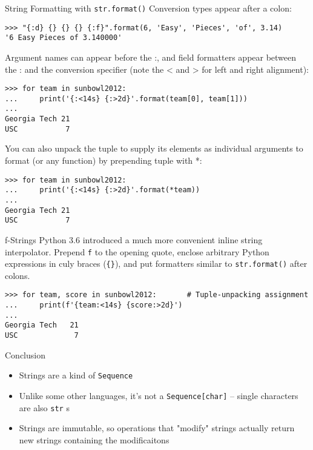 \documentclass[smaller, aspectratio=1610]{beamer}
\begin{document}
\begin{frame}[label={sec:org62fce8c},fragile]{String Formatting with \texttt{str.format()}}
 Conversion types appear after a colon:

\lstset{language=Python,label= ,caption= ,captionpos=b,numbers=none}
\begin{lstlisting}
>>> "{:d} {} {} {} {:f}".format(6, 'Easy', 'Pieces', 'of', 3.14)
'6 Easy Pieces of 3.140000'
\end{lstlisting}

Argument names can appear before the :, and field formatters appear
between the : and the conversion specifier (note the < and > for left
and right alignment):

\lstset{language=Python,label= ,caption= ,captionpos=b,numbers=none}
\begin{lstlisting}
>>> for team in sunbowl2012:
...     print('{:<14s} {:>2d}'.format(team[0], team[1]))
...
Georgia Tech 21
USC           7
\end{lstlisting}

You can also unpack the tuple to supply its elements as individual
arguments to format (or any function) by prepending tuple with *:

\lstset{language=Python,label= ,caption= ,captionpos=b,numbers=none}
\begin{lstlisting}
>>> for team in sunbowl2012:
...     print('{:<14s} {:>2d}'.format(*team))
...
Georgia Tech 21
USC           7
\end{lstlisting}
\end{frame}

\begin{frame}[label={sec:org6b25336},fragile]{f-Strings}
 Python 3.6 introduced a much more convenient inline string interpolator.  Prepend \texttt{f} to the opening quote, enclose arbitrary Python expressions in culy braces (\texttt{\{\}}), and put formatters similar to \texttt{str.format()} after colons.

\lstset{language=Python,label= ,caption= ,captionpos=b,numbers=none}
\begin{lstlisting}
>>> for team, score in sunbowl2012:       # Tuple-unpacking assignment
...     print(f'{team:<14s} {score:>2d}')
...
Georgia Tech   21
USC             7
\end{lstlisting}
\end{frame}

\begin{frame}[label={sec:org06f2709},fragile]{Conclusion}
 \begin{itemize}
\item Strings are a kind of \texttt{Sequence}
\item Unlike some other languages, it's not a \texttt{Sequence[char]} -- single characters are also \texttt{str} s
\item Strings are immutable, so operations that "modify" strings actually return new strings containing the modificaitons
\end{itemize}
\end{frame}
\end{document}
